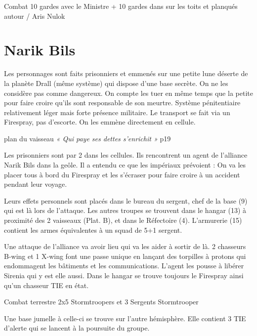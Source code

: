 \documentclass[a4paper,10pt,twoside,twocolumn,openany]{book}
\begin{document}
\begin{commentbox}{Combat}
10 gardes avec le Ministre + 10 gardes dans sur les toits et planqués autour / Aris Nulok
\end{commentbox}

\section{Narik Bils}

Les personnages sont faits prisonniers et emmenés sur une petite lune déserte de la planète
Drall (même système) qui dispose d'une base secrète. On ne les considère pas comme
dangereux. On compte les tuer en même temps que la petite pour faire croire qu’ils sont
responsable de son meurtre. Système pénitentiaire relativement léger mais forte présence
militaire. Le transport se fait via un Firespray, pas d’escorte. On les emmène directement en
cellule.

\begin{commentbox}{plan du vaisseau}
\emph{« Qui paye ses dettes s’enrichit » }​p19
\end{commentbox}

Les prisonniers sont par 2 dans les cellules. Ils rencontrent un agent de l'alliance Narik Bils dans
la geôle. Il a entendu ce que les impériaux prévoient : On va les placer tous à bord du Firespray
et les s’écraser pour faire croire à un accident pendant leur voyage.

Leurs effets personnels sont placés dans le bureau du sergent, chef de la base (9) qui est là lors
de l’attaque. Les autres troupes se trouvent dans le hangar (13) à proximité des 2 vaisseaux
(Plat. B), et dans le Réfectoire (4). L’armurerie (15) contient les armes équivalentes à un squad
de 5+1 sergent.

Une attaque de l'alliance va avoir lieu qui va les aider à sortir de là. 2 chasseurs B-wing et 1
X-wing font une passe unique en lançant des torpilles à protons qui endommagent les bâtiments
et les communications. L'agent les pousse à libérer Sirenia qui y est elle aussi. Dans le hangar
se trouve toujours le Firespray ainsi qu’un chasseur TIE en état.

\begin{commentbox}{Combat terrestre}
2x5 Stormtroopers et 3 Sergents Stormtrooper
\end{commentbox}

Une base jumelle à celle-ci se trouve sur l’autre hémisphère. Elle contient 3 TIE d’alerte qui se
lancent à la poursuite du groupe.
\end{document}
